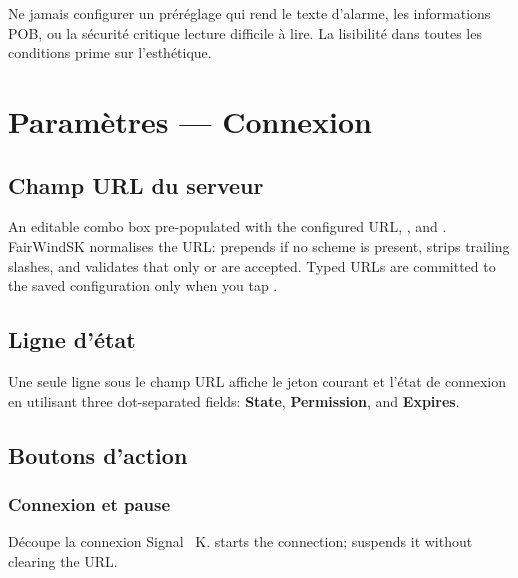\begin{warningbox}
Ne jamais configurer un préréglage qui rend le texte d'alarme, les informations POB, ou la sécurité critique
lecture difficile à lire.
La lisibilité dans toutes les conditions prime sur l'esthétique.
\end{warningbox}

\chapter{Paramètres --- Connexion}
\label{ch:settings-connection}


\section{Champ URL du serveur}

An editable combo box pre-populated with the configured URL, ,
and .
FairWindSK normalises the URL: prepends  if no scheme is present,
strips trailing slashes, and validates that only  or  are accepted.
Typed URLs are committed to the saved configuration only when you tap .

\section{Ligne d'état}

Une seule ligne sous le champ URL affiche le jeton courant et l'état de connexion en utilisant
three dot-separated fields: \textbf{State}, \textbf{Permission}, and \textbf{Expires}.

\section{Boutons d'action}

\subsection{Connexion et pause}

Découpe la connexion Signal ~K.
 starts the connection;  suspends it without clearing the URL.

